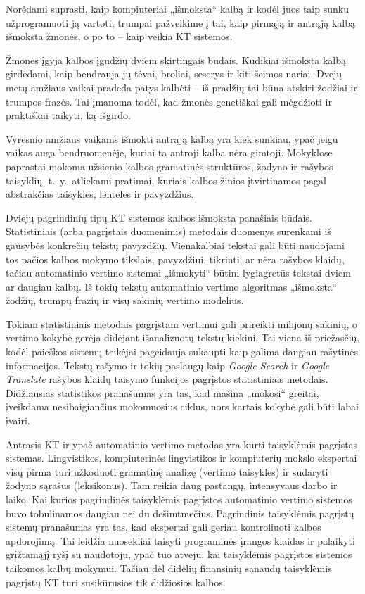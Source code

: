 \documentclass[]{../metanetpaper}
\begin{document}
\begin{multicols}{2}
Norėdami suprasti, kaip kompiuteriai „išmoksta“ kalbą ir kodėl juos taip sunku užprogramuoti ją vartoti, trumpai pažvelkime į tai, kaip pirmąją ir antrąją kalbą išmoksta žmonės, o po to – kaip veikia KT sistemos.


Žmonės įgyja kalbos įgūdžių dviem skirtingais būdais. Kūdikiai išmoksta kalbą girdėdami, kaip bendrauja jų tėvai, broliai, seserys ir kiti šeimos nariai. Dvejų metų amžiaus vaikai pradeda patys kalbėti – iš pradžių tai būna atskiri žodžiai ir trumpos frazės. Tai įmanoma  todėl, kad žmonės  genetiškai gali mėgdžioti ir praktiškai taikyti, ką išgirdo.

Vyresnio amžiaus vaikams išmokti antrąją kalbą yra kiek sunkiau, ypač jeigu vaikas auga bendruomenėje, kuriai ta antroji kalba nėra gimtoji. Mokyklose paprastai mokoma užsienio kalbos gramatinės struktūros, žodyno ir rašybos taisyklių, t.~y.~atliekami pratimai, kuriais kalbos žinios įtvirtinamos pagal abstrakčias taisykles, lenteles ir pavyzdžius. 

Dviejų pagrindinių tipų KT sistemos kalbos išmoksta panašiais būdais. Statistiniais (arba pagrįstais duomenimis) metodais duomenys surenkami iš gausybės konkrečių tekstų pavyzdžių. Vienakalbiai tekstai gali būti naudojami tos pačios kalbos mokymo tikslais, pavyzdžiui, tikrinti, ar nėra rašybos klaidų, tačiau automatinio vertimo sistemai „išmokyti“ būtini lygiagretūs tekstai dviem ar daugiau kalbų. Iš tokių tekstų automatinio vertimo algoritmas „išmoksta“ žodžių, trumpų frazių ir visų sakinių vertimo modelius. 

Tokiam statistiniais metodais pagrįstam vertimui gali prireikti milijonų sakinių, o vertimo kokybė gerėja didėjant išanalizuotų tekstų kiekiui. Tai viena iš priežasčių, kodėl paieškos sistemų teikėjai pageidauja sukaupti kaip galima daugiau rašytinės informacijos. Tekstų rašymo ir tokių paslaugų kaip \textit{Google Search} ir \textit{Google Translate} rašybos klaidų taisymo funkcijos pagrįstos statistiniais metodais. Didžiausias statistikos pranašumas yra tas, kad mašina „mokosi“ greitai, įveikdama nesibaigiančius mokomuosius ciklus, nors kartais kokybė gali būti labai įvairi.

Antrasis KT ir ypač automatinio vertimo metodas yra kurti taisyklėmis pagrįstas sistemas. Lingvistikos, kompiuterinės lingvistikos ir kompiuterių mokslo ekspertai visų pirma turi užkoduoti gramatinę analizę (vertimo taisykles) ir sudaryti žodyno sąrašus (leksikonus). Tam reikia daug pastangų, intensyvaus darbo ir laiko. Kai kurios pagrindinės taisyklėmis pagrįstos automatinio vertimo sistemos buvo tobulinamos daugiau nei du dešimtmečius. Pagrindinis taisyklėmis pagrįstų sistemų pranašumas yra tas, kad ekspertai gali geriau kontroliuoti kalbos apdorojimą. Tai leidžia nuosekliai taisyti programinės įrangos klaidas ir palaikyti grįžtamąjį ryšį su naudotoju, ypač tuo atveju, kai taisyklėmis pagrįstos sistemos taikomos kalbų mokymui. Tačiau dėl didelių finansinių sąnaudų taisyklėmis pagrįstų KT turi susikūrusios tik didžiosios kalbos. 


\end{multicols}
\end{document}
